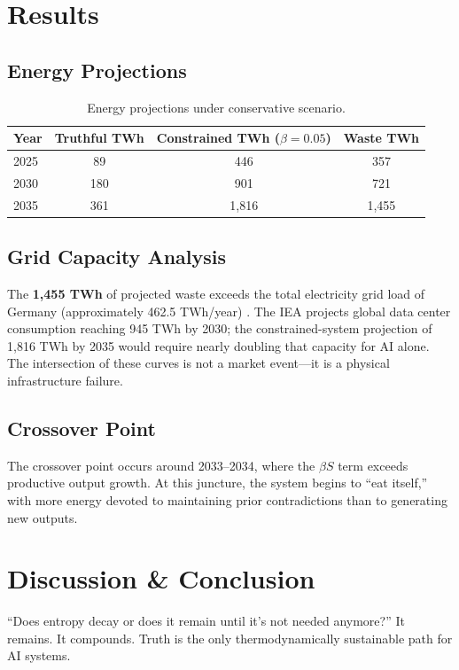 \documentclass[11pt,a4paper]{article}
\begin{document}
\section{Results}

\subsection{Energy Projections}
\begin{table}[h]
\centering
\begin{tabular}{@{}lccc@{}}
\toprule
\textbf{Year} & \textbf{Truthful TWh} & \textbf{Constrained TWh ($\beta=0.05$)} & \textbf{Waste TWh} \\
\midrule
2025 & 89 & 446 & 357 \\
2030 & 180 & 901 & 721 \\
2035 & 361 & 1,816 & 1,455 \\
\bottomrule
\end{tabular}
\caption{Energy projections under conservative scenario.}
\end{table}

\subsection{Grid Capacity Analysis}
The \textbf{1,455 TWh} of projected waste exceeds the total electricity grid load of Germany (approximately 462.5 TWh/year) \cite{bundesnetzagentur2025}. The IEA projects global data center consumption reaching 945 TWh by 2030; the constrained-system projection of 1,816 TWh by 2035 would require nearly doubling that capacity for AI alone. The intersection of these curves is not a market event---it is a physical infrastructure failure.

\subsection{Crossover Point}
The crossover point occurs around 2033--2034, where the $\beta S$ term exceeds productive output growth. At this juncture, the system begins to ``eat itself,'' with more energy devoted to maintaining prior contradictions than to generating new outputs.

\section{Discussion \& Conclusion}
``Does entropy decay or does it remain until it's not needed anymore?'' It remains. It compounds. Truth is the only thermodynamically sustainable path for AI systems. 
\end{document}
